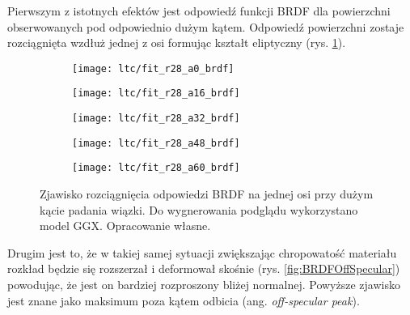 \documentclass[../main.tex]{subfiles}
\begin{document}
Pierwszym z istotnych efektów jest odpowiedź funkcji BRDF dla powierzchni obserwowanych pod odpowiednio dużym kątem. Odpowiedź powierzchni zostaje rozciągnięta wzdłuż jednej z osi formując kształt eliptyczny (rys. \ref{fig:BRDFGrazingAnisotropy}).

\begin{figure}
    \centering
    
    \begin{subfigure}[t]{0.18\textwidth}
        \texttt{[image: ltc/fit\_r28\_a0\_brdf]}
    \end{subfigure}
    \begin{subfigure}[t]{0.18\textwidth}
        \texttt{[image: ltc/fit\_r28\_a16\_brdf]}
    \end{subfigure}
    \begin{subfigure}[t]{0.18\textwidth}
        \texttt{[image: ltc/fit\_r28\_a32\_brdf]}
    \end{subfigure}
    \begin{subfigure}[t]{0.18\textwidth}
        \texttt{[image: ltc/fit\_r28\_a48\_brdf]}
    \end{subfigure}
    \begin{subfigure}[t]{0.18\textwidth}
        \texttt{[image: ltc/fit\_r28\_a60\_brdf]}
    \end{subfigure}
    
    \caption{Zjawisko rozciągnięcia odpowiedzi BRDF na jednej osi przy dużym kącie padania wiązki. Do wygnerowania podglądu wykorzystano model GGX. Opracowanie własne.}
    \label{fig:BRDFGrazingAnisotropy}
\end{figure}

Drugim jest to, że w takiej samej sytuacji zwiększając chropowatość materiału rozkład będzie się rozszerzał i deformował skośnie (rys. \ref{fig:BRDFOffSpecular}) powodując, że jest on bardziej rozproszony bliżej normalnej. Powyższe zjawisko jest znane jako maksimum poza kątem odbicia (ang. \textit{off-specular peak}).
\end{document}
